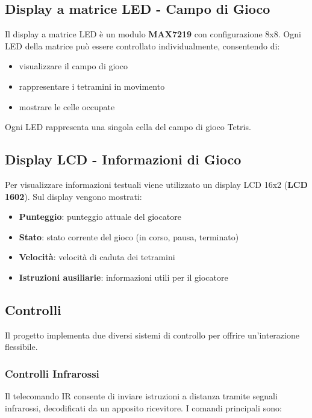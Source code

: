 \documentclass[a4paper, 12pt]{article}
\begin{document}
\subsection{Display a matrice LED - Campo di Gioco}
\label{subsec:display-matrice}
Il display a matrice LED è un modulo \textbf{MAX7219} con configurazione 8x8. Ogni LED della matrice può essere controllato individualmente, consentendo di:
\begin{itemize}
	\item visualizzare il campo di gioco
	\item rappresentare i tetramini in movimento
	\item mostrare le celle occupate
\end{itemize}

Ogni LED rappresenta una singola cella del campo di gioco Tetris.

\subsection{Display LCD - Informazioni di Gioco}
\label{subsec:display-lcd}
Per visualizzare informazioni testuali viene utilizzato un display LCD 16x2 (\textbf{LCD 1602}). Sul display vengono mostrati:
\begin{itemize}
	\item \textbf{Punteggio}: punteggio attuale del giocatore
	\item \textbf{Stato}: stato corrente del gioco (in corso, pausa, terminato)
	\item \textbf{Velocità}: velocità di caduta dei tetramini
	\item \textbf{Istruzioni ausiliarie}: informazioni utili per il giocatore
\end{itemize}

\subsection{Controlli}
\label{subsec:controlli}
Il progetto implementa due diversi sistemi di controllo per offrire un'interazione flessibile.

\subsubsection{Controlli Infrarossi}
\label{subsubsec:controlli-ir}
Il telecomando IR consente di inviare istruzioni a distanza tramite segnali infrarossi, decodificati da un apposito ricevitore. I comandi principali sono:
\end{document}
